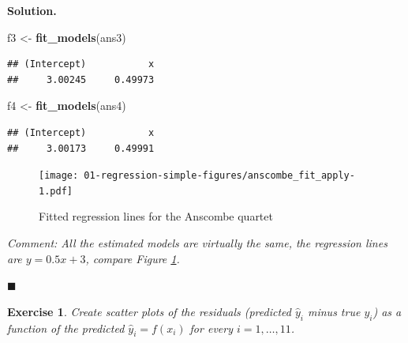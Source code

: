 \documentclass[10pt,b5paper,krantz1]{krantz}
\newenvironment{Shaded}{\begin{snugshade}}{\end{snugshade}}
\newcommand{\KeywordTok}[1]{\textcolor[rgb]{0.27,0.27,0.27}{\textbf{#1}}}
\newcommand{\NormalTok}[1]{#1}
\newcommand{\StringTok}[1]{\textcolor[rgb]{0.5,0.5,0.5}{#1}}
\newtheorem{exercise}{Exercise}[chapter]
\newenvironment{solution}{%
\bigskip\noindent\textbf{Solution. }%
\it\ignorespaces%
\ignorespaces%
}{\ignorespaces%
\hfill$\blacksquare$%
}
\begin{document}
\begin{solution}
\begin{Shaded}
\begin{Highlighting}[]
\NormalTok{f3 <-}\StringTok{ }\KeywordTok{fit_models}\NormalTok{(ans3)}
\end{Highlighting}
\end{Shaded}

\begin{verbatim}
## (Intercept)           x 
##     3.00245     0.49973
\end{verbatim}

\begin{Shaded}
\begin{Highlighting}[]
\NormalTok{f4 <-}\StringTok{ }\KeywordTok{fit_models}\NormalTok{(ans4)}
\end{Highlighting}
\end{Shaded}

\begin{verbatim}
## (Intercept)           x 
##     3.00173     0.49991
\end{verbatim}

\begin{figure}
\hypertarget{fig:anscombe_fit_apply}{%
\centering
\texttt{[image: 01-regression-simple-figures/anscombe\_fit\_apply-1.pdf]}
\caption{Fitted regression lines for the Anscombe quartet}\label{fig:anscombe_fit_apply}
}
\end{figure}

\emph{Comment: All the estimated models are virtually the same,
the regression lines are
\(y=0.5x+3\), compare Figure \ref{fig:anscombe_fit_apply}.}

\end{solution}

\begin{exercise}

Create scatter plots of the residuals (predicted \(\hat{y}_i\) minus
true \(y_i\)) as a function of the predicted \(\hat{y}_i=f(x_i)\) for every
\(i=1,\dots,11\).

\end{exercise}
\end{document}
